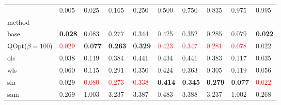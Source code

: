 \begin{tabular}{llllllllll}
\toprule
 & 0.005 & 0.025 & 0.165 & 0.250 & 0.500 & 0.750 & 0.835 & 0.975 & 0.995 \\
method &  &  &  &  &  &  &  &  &  \\
\midrule
base & \textbf{0.028} & 0.083 & 0.277 & 0.344 & 0.425 & 0.352 & 0.285 & 0.079 & \textbf{0.022} \\
\midrule
QOpt($\beta=100$) & \textcolor{red}{0.029} & \textbf{0.077} & \textbf{0.263} & \textbf{0.329} & \textcolor{red}{0.423} & \textcolor{red}{0.347} & \textcolor{red}{0.281} & \textcolor{red}{0.078} & 0.022 \\
ols & 0.038 & 0.119 & 0.384 & 0.441 & 0.434 & 0.441 & 0.383 & 0.117 & 0.035 \\
wls & 0.060 & 0.115 & 0.291 & 0.350 & 0.424 & 0.363 & 0.305 & 0.119 & 0.056 \\
shr & 0.029 & \textcolor{red}{0.080} & \textcolor{red}{0.273} & \textcolor{red}{0.338} & \textbf{0.414} & \textbf{0.345} & \textbf{0.279} & \textbf{0.077} & \textcolor{red}{0.022} \\
sam & 0.269 & 1.003 & 3.237 & 3.387 & 0.483 & 3.388 & 3.237 & 1.002 & 0.268 \\
\bottomrule
\end{tabular}